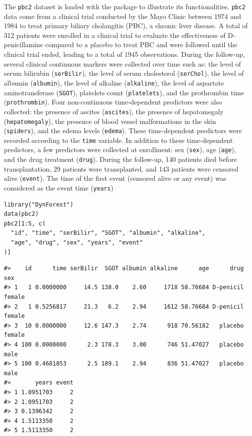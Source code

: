 The \texttt{pbc2} dataset \citep{murtaugh_primary_1994} is loaded with the package  to illustrate its functionalities. \texttt{pbc2} data come from a clinical trial conducted by the Mayo Clinic between 1974 and 1984 to treat primary biliary cholangitis (PBC), a chronic liver disease. A total of 312 patients were enrolled in a clinical trial to evaluate the effectiveness of D-penicillamine compared to a placebo to treat PBC and were followed until the clinical trial ended, leading to a total of 1945 observations. During the follow-up, several clinical continuous markers were collected over time such as: the level of serum bilirubin (\texttt{serBilir}), the level of serum cholesterol (\texttt{serChol}), the level of albumin (\texttt{albumin}), the level of alkaline (\texttt{alkaline}), the level of aspartate aminotransferase (\texttt{SGOT}), platelets count (\texttt{platelets}), and the prothrombin time (\texttt{prothrombin}). Four non-continuous time-dependent predictors were also collected: the presence of ascites (\texttt{ascites}), the presence of hepatomegaly (\texttt{hepatomegaly}), the presence of blood vessel malformations in the skin (\texttt{spiders}), and the edema levels (\texttt{edema}). These time-dependent predictors were recorded according to the \texttt{time} variable. In addition to these time-dependent predictors, a few predictors were collected at enrollment: sex (\texttt{sex}), age (\texttt{age}), and the drug treatment (\texttt{drug}). During the follow-up, 140 patients died before transplantation, 29 patients were transplanted, and 143 patients were censored alive (\texttt{event}). The time of the first event (censored alive or any event) was considered as the event time (\texttt{years})

\begin{verbatim}
library("DynForest")
data(pbc2)
pbc2[1:5, c(
  "id", "time", "serBilir", "SGOT", "albumin", "alkaline",
  "age", "drug", "sex", "years", "event"
)]
\end{verbatim}

\begin{verbatim}
#>    id      time serBilir  SGOT albumin alkaline      age      drug    sex
#> 1   1 0.0000000     14.5 138.0    2.60     1718 58.76684 D-penicil female
#> 2   1 0.5256817     21.3   6.2    2.94     1612 58.76684 D-penicil female
#> 3  10 0.0000000     12.6 147.3    2.74      918 70.56182   placebo female
#> 4 100 0.0000000      2.3 178.3    3.00      746 51.47027   placebo   male
#> 5 100 0.4681853      2.5 189.1    2.94      836 51.47027   placebo   male
#>       years event
#> 1 1.0951703     2
#> 2 1.0951703     2
#> 3 0.1396342     2
#> 4 1.5113350     2
#> 5 1.5113350     2
\end{verbatim}

